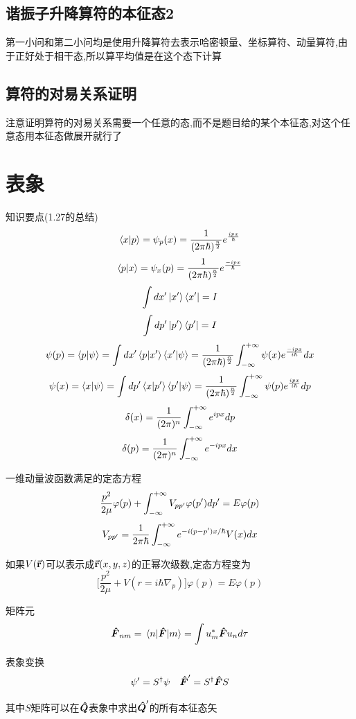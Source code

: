 \documentclass{article}
\begin{document}
        \subsection{谐振子升降算符的本征态2}
            第一小问和第二小问均是使用升降算符去表示哈密顿量、坐标算符、动量算符,由于正好处于相干态,所以算平均值是在这个态下计算
        
        \subsection{算符的对易关系证明}
            注意证明算符的对易关系需要一个任意的态,而不是题目给的某个本征态,对这个任意态用本征态做展开就行了
        

        

    \section{表象}
            \begin{formal}
                知识要点(1.27的总结)
                $$ \braket{x}{p} = \psi_{p} (x) = \frac{1}{(2 \pi \hbar)^{\frac{n}{2}}} e^{\frac{ipx}{\hbar}} $$ 
                $$ \braket{p}{x} = \psi_{x} (p) = \frac{1}{(2 \pi \hbar)^{\frac{n}{2}}} e^{\frac{-ipx}{\hbar}} $$ 
                $$ \int dx' \ket{x'} \bra{x'} = I $$ 
                $$ \int dp' \ket{p'} \bra{p'} = I $$ 
                $$ \psi(p) = \braket{p}{\psi} = \int dx' \braket{p}{x'} \braket{x'}{\psi} = \frac{1}{(2 \pi \hbar)^{\frac{n}{2}}} \int_{-\infty}^{+\infty} \psi(x) e^{\frac{-ipx}{i\hbar}} dx $$
                $$ \psi(x) = \braket{x}{\psi} = \int dp' \braket{x}{p'} \braket{p'}{\psi} = \frac{1}{(2 \pi \hbar)^{\frac{n}{2}}} \int_{-\infty}^{+\infty} \psi(p) e^{\frac{ipx}{i\hbar}}  dp $$
                $$ \delta(x) = \frac{1}{(2\pi)^{n}} \int_{-\infty}^{+\infty} e^{ipx} dp $$
                $$ \delta(p) = \frac{1}{(2\pi)^{n}} \int_{-\infty}^{+\infty} e^{-ipx} dx $$

                一维动量波函数满足的定态方程
                $$ \frac{p^{2}}{2\mu} \varphi(p) + \int_{-\infty}^{+\infty} V_{pp'} \varphi(p') dp' = E\varphi(p) $$
                $$ V_{pp'} = \frac{1}{2\pi \hbar} \int_{-\infty}^{+\infty} e^{-i(p-p')x/\hbar} V(x)dx $$
                
                如果$V(\va{r})$可以表示成$\va{r}(x,y,z)$的正幂次级数,定态方程变为
                $$ \big[\frac{p^{2}}{2\mu}+V(r=i\hbar \nabla_{p})\big]\varphi(p) = E\varphi(p) $$

                

                矩阵元
                $$ \vu*{F}_{nm} = \mel{n}{\vu*{F}}{m} = \int u^{*}_{m} \vu*{F} u_{n} d\tau  $$

                表象变换
                $$ \psi' = S^{\dagger} \psi \quad \vu*{F}' = S^{\dagger} \vu*{F} S $$

                其中$S$矩阵可以在$\vu*{Q}$表象中求出$\vu*{Q}'$的所有本征态矢



            \end{formal}
        
\end{document}
